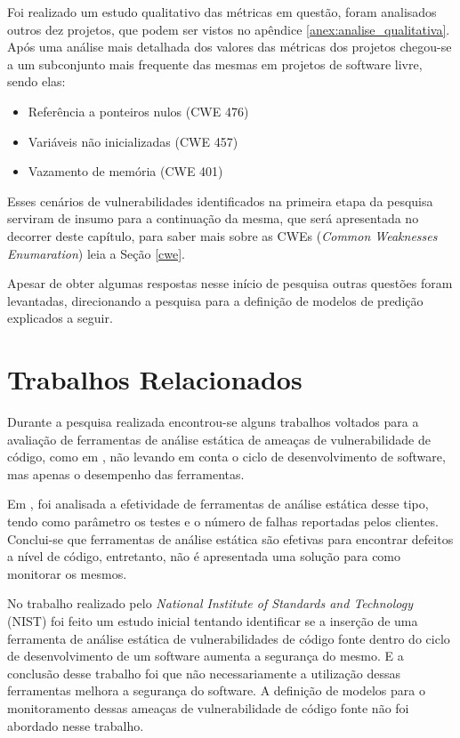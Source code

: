 Foi realizado um estudo qualitativo das métricas em questão, foram analisados
outros dez projetos, que podem ser vistos no apêndice
\ref{anex:analise_qualitativa}. Após uma análise mais detalhada dos valores das
métricas dos projetos chegou-se a um subconjunto mais frequente das mesmas em
projetos de software livre, sendo elas:

\begin{itemize}\label{principais_vuln}
  \item Referência a ponteiros nulos (CWE 476)
  \item Variáveis não inicializadas (CWE 457)
  \item Vazamento de memória (CWE 401)
\end{itemize}

Esses cenários de vulnerabilidades identificados na primeira etapa da pesquisa
serviram de insumo para a continuação da mesma, que será apresentada no decorrer
deste capítulo, para saber mais sobre as CWEs (\textit{Common Weaknesses
Enumaration}) leia a Seção \ref{cwe}.

Apesar de obter algumas respostas nesse início de pesquisa outras questões
foram levantadas, direcionando a pesquisa para a definição de modelos de
predição explicados a seguir.




\section{Trabalhos Relacionados}\label{metodologia:trabalhosrelacionados}

Durante a pesquisa realizada encontrou-se alguns trabalhos voltados para a
avaliação de ferramentas de análise estática de ameaças de vulnerabilidade de
código, como em , não levando em conta
o ciclo de desenvolvimento de software, mas apenas o desempenho das ferramentas.

Em , foi analisada a efetividade de ferramentas
de análise estática desse tipo, tendo como parâmetro os testes e o número de
falhas reportadas pelos clientes. Conclui-se que ferramentas de análise estática
são efetivas para encontrar defeitos a nível de código, entretanto, não é
apresentada uma solução para como monitorar os mesmos.

No trabalho realizado pelo \textit{National Institute of Standards and
Technology} (NIST) \cite{nist_effect_static_analysis:2007} foi feito um estudo
inicial tentando identificar se a inserção de uma ferramenta de análise estática
de vulnerabilidades de código fonte dentro do ciclo de desenvolvimento de um
software aumenta a segurança do mesmo. E a conclusão desse trabalho foi que não
necessariamente a utilização dessas ferramentas melhora a segurança do
software. A definição de modelos para o monitoramento dessas ameaças de
vulnerabilidade de código fonte não foi abordado nesse trabalho.

